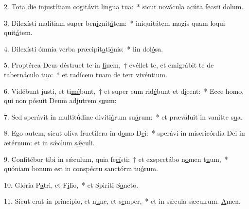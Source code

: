 2. Tota die injustítiam cogitávit l\uline{i}ngua t\uline{u}a:~* sicut novácula acúta fecsti d\uline{o}lum.\par 
3. Dilexísti malítiam super ben\uline{i}gnit\uline{á}tem:~* iniquitátem magis quam loqui quit\uline{á}tem.\par 
4. Dilexísti ómnia verba præcipit\uline{a}ti\uline{ó}nis:~* lin dol\uline{ó}sa.\par 
5. Proptérea Deus déstruet te in \uline{fi}nem,~† evéllet te, et emigrábit te de tabern\uline{á}culo t\uline{u}o:~* et radícem tuam de terr viv\uline{é}ntium.\par 
6. Vidébunt justi, et ti\uline{mé}bunt,~† et super eum rid\uline{é}bunt et d\uline{i}cent:~* Ecce homo, qui non pósuit Deum adjutrem s\uline{u}um:\par 
7. Sed sperávit in multitúdine diviti\uline{á}rum su\uline{á}rum:~* et præváluit in vanitte s\uline{u}a.\par 
8. Ego autem, sicut olíva fructífera in d\uline{o}mo D\uline{e}i:~* sperávi in misericórdia Dei in ætérnum: et in sǽclum s\uline{ǽ}culi.\par 
9. Confitébor tibi in sǽculum, quia fe\uline{cí}sti:~† et exspectábo n\uline{o}men t\uline{u}um,~* quóniam bonum est in conspéctu sanctórm tu\uline{ó}rum.\par 
10. Glória P\uline{a}tri, et F\uline{í}lio,~* et Spiríti S\uline{a}ncto.\par 
11. Sicut erat in princípio, et n\uline{u}nc, et s\uline{e}mper,~* et in sǽcula sæculrum. \uline{A}men.\par 
